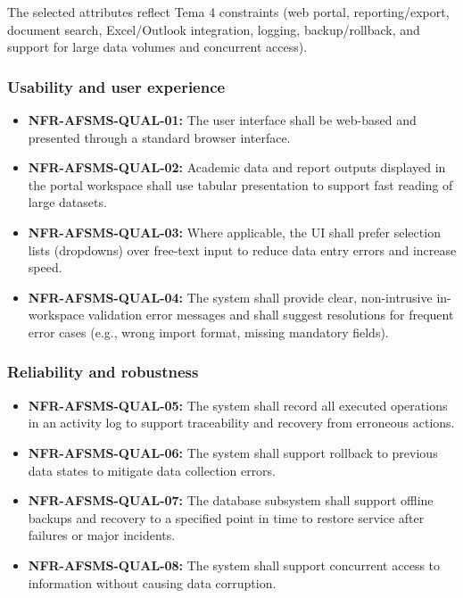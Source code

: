 \documentclass[11pt, a4paper]{article}
\begin{document}
The selected attributes reflect Tema 4 constraints (web portal, reporting/export, document search, Excel/Outlook integration, logging, backup/rollback, and support for large data volumes and concurrent access).

\subsubsection{Usability and user experience}
\begin{itemize}
    \item \textbf{NFR-AFSMS-QUAL-01:} The user interface shall be web-based and presented through a standard browser interface.
    \item \textbf{NFR-AFSMS-QUAL-02:} Academic data and report outputs displayed in the portal workspace shall use tabular presentation to support fast reading of large datasets.
    \item \textbf{NFR-AFSMS-QUAL-03:} Where applicable, the UI shall prefer selection lists (dropdowns) over free-text input to reduce data entry errors and increase speed.
    \item \textbf{NFR-AFSMS-QUAL-04:} The system shall provide clear, non-intrusive in-workspace validation error messages and shall suggest resolutions for frequent error cases (e.g., wrong import format, missing mandatory fields).
\end{itemize}

\subsubsection{Reliability and robustness}
\begin{itemize}
    \item \textbf{NFR-AFSMS-QUAL-05:} The system shall record all executed operations in an activity log to support traceability and recovery from erroneous actions.
    \item \textbf{NFR-AFSMS-QUAL-06:} The system shall support rollback to previous data states to mitigate data collection errors.
    \item \textbf{NFR-AFSMS-QUAL-07:} The database subsystem shall support offline backups and recovery to a specified point in time to restore service after failures or major incidents.
    \item \textbf{NFR-AFSMS-QUAL-08:} The system shall support concurrent access to information without causing data corruption.
\end{itemize}
\end{document}
